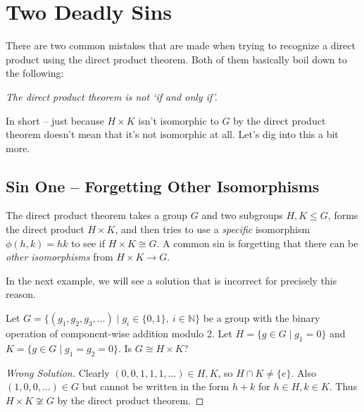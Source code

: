 \documentclass[11pt]{article}
\begin{document}
\section{ Two Deadly Sins}

There are two common mistakes that are made when trying to recognize a direct product using the direct product theorem. Both of them basically boil down to the following:

\begin{center}
	\emph{The direct product theorem is not `if and only if'.}
\end{center}

In short -- just because $H \times K$ isn't isomorphic to $G$ by the direct product theorem doesn't mean that it's not isomorphic at all.
Let's dig into this a bit more.

\subsection{Sin One -- Forgetting Other Isomorphisms}

The direct product theorem takes a group $G$ and two subgroups $H, K \leq G$, forms the direct product $H \times K$, and then tries to use a \emph{specific} isomorphism $\phi(h, k) = hk$ to see if $H \times K \cong G$. A common sin is forgetting that there can be \emph{other isomorphisms} from $H \times K \rightarrow G$. 

In the next example, we will see a solution that is incorrect for precisely this reason.

\begin{example}
	Let $G = \{(g_1, g_2, g_3, \dots) \mid g_i \in \{0, 1\},\  i \in \mathbb{N}\}$ be a group with the binary operation of component-wise addition modulo 2. Let $H = \{g \in G \mid g_1 = 0 \}$ and $K = \{g \in G \mid g_1 = g_2 = 0 \}$. Is $G \cong H \times K$?
\end{example}
\begin{proof}[{\color{Maroon}Wrong Solution}]
	Clearly $(0, 0, 1, 1, 1, \dots) \in H, K$, so $H \cap K \neq \{e \}$. Also $(1, 0, 0, \dots) \in G$ but cannot be written in the form $h+k$ for $h \in H, k \in K$. Thus $H \times K \not \cong G$ by the direct product theorem.
\end{proof}
\end{document}
